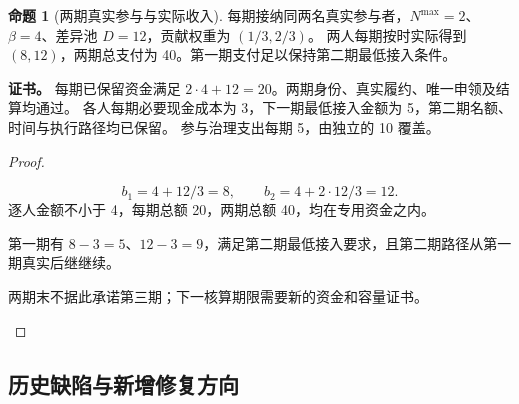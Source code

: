 \documentclass[UTF8,12pt,a4paper,openany,fontset=none,zihao=false]{ctexrep}
\theoremstyle{definition}
\newtheorem{proposition}{命题}[chapter]
\newenvironment{certificate}{\par\noindent\textbf{证书。}\ignorespaces}{\par}
\newcommand{\1}{\mathbf 1}
\begin{document}
\begin{proposition}[两期真实参与与实际收入]
每期接纳同两名真实参与者，\(N^{\max}=2\)、\(\beta=4\)、差异池 \(D=12\)，贡献权重为 \((1/3,2/3)\)。
两人每期按时实际得到 \((8,12)\)，两期总支付为 40。第一期支付足以保持第二期最低接入条件。
\end{proposition}
\begin{certificate}
每期已保留资金满足 \(2\cdot4+12=20\)。两期身份、真实履约、唯一申领及结算均通过。
各人每期必要现金成本为 3，下一期最低接入金额为 5，第二期名额、时间与执行路径均已保留。
参与治理支出每期 5，由独立的 10 覆盖。
\end{certificate}
\begin{proof}
\begin{semanticsteps}
\item \[
b_1=4+12/3=8,\qquad b_2=4+2\cdot12/3=12.
\]
逐人金额不小于 4，每期总额 20，两期总额 40，均在专用资金之内。
\item 第一期有 \(8-3=5\)、\(12-3=9\)，满足第二期最低接入要求，且第二期路径从第一期真实后继继续。
\item 两期末不据此承诺第三期；下一核算期限需要新的资金和容量证书。
\end{semanticsteps}
\end{proof}

\subsection{历史缺陷与新增修复方向}
\end{document}
